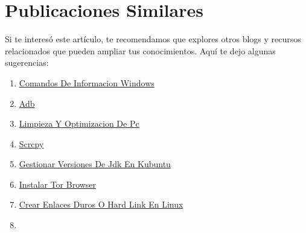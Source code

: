\documentclass[
  doc,
  floatsintext,
  longtable,
  a4paper,
  nolmodern,
  notxfonts,
  notimes,
  12pt,
  colorlinks=true,linkcolor=blue,citecolor=blue,urlcolor=blue]{apa7}
\providecommand{\tightlist}{%
  \setlength{\itemsep}{0pt}\setlength{\parskip}{0pt}}
\begin{document}
\section{Publicaciones Similares}\label{publicaciones-similares}

Si te interesó este artículo, te recomendamos que explores otros blogs y
recursos relacionados que pueden ampliar tus conocimientos. Aquí te dejo
algunas sugerencias:

\begin{enumerate}
\def\labelenumi{\arabic{enumi}.}
\tightlist
\item
  \href{https://chaska-x.netlify.app/operating-system/2017-05-21-comandos-de-informacion-windows/index.pdf}{}
  \href{https://chaska-x.netlify.app/operating-system/2017-05-21-comandos-de-informacion-windows}{Comandos
  De Informacion Windows}
\item
  \href{https://chaska-x.netlify.app/operating-system/2019-06-19-adb/index.pdf}{}
  \href{https://chaska-x.netlify.app/operating-system/2019-06-19-adb}{Adb}
\item
  \href{https://chaska-x.netlify.app/operating-system/2021-08-17-limpieza-y-optimizacion-de-pc/index.pdf}{}
  \href{https://chaska-x.netlify.app/operating-system/2021-08-17-limpieza-y-optimizacion-de-pc}{Limpieza
  Y Optimizacion De Pc}
\item
  \href{https://chaska-x.netlify.app/operating-system/2021-10-21-scrcpy/index.pdf}{}
  \href{https://chaska-x.netlify.app/operating-system/2021-10-21-scrcpy}{Scrcpy}
\item
  \href{https://chaska-x.netlify.app/operating-system/2022-05-12-gestionar-versiones-de-jdk-en-kubuntu/index.pdf}{}
  \href{https://chaska-x.netlify.app/operating-system/2022-05-12-gestionar-versiones-de-jdk-en-kubuntu}{Gestionar
  Versiones De Jdk En Kubuntu}
\item
  \href{https://chaska-x.netlify.app/operating-system/2022-07-21-instalar-tor-browser/index.pdf}{}
  \href{https://chaska-x.netlify.app/operating-system/2022-07-21-instalar-tor-browser}{Instalar
  Tor Browser}
\item
  \href{https://chaska-x.netlify.app/operating-system/2022-08-14-crear-enlaces-duros-o-hard-link-en-linux/index.pdf}{}
  \href{https://chaska-x.netlify.app/operating-system/2022-08-14-crear-enlaces-duros-o-hard-link-en-linux}{Crear
  Enlaces Duros O Hard Link En Linux}
\item

\end{enumerate}
\end{document}
